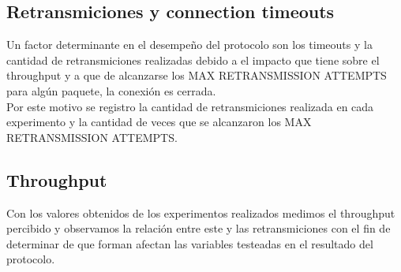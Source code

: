 \subsection{Retransmiciones y connection timeouts}

Un factor determinante en el desempeño del protocolo son los timeouts y la cantidad de retransmiciones realizadas debido a el impacto que tiene sobre el throughput y a que de alcanzarse los MAX RETRANSMISSION ATTEMPTS para algún paquete, la conexión es cerrada.	\\
\indent	Por este motivo se registro la cantidad de retransmiciones realizada en cada experimento y la cantidad de veces que se alcanzaron los MAX RETRANSMISSION ATTEMPTS.

\subsection{Throughput}

Con los valores obtenidos de los experimentos realizados medimos el throughput percibido y observamos la relación entre este y las retransmiciones con el fin de determinar de que forman afectan las variables testeadas en el resultado del protocolo.
